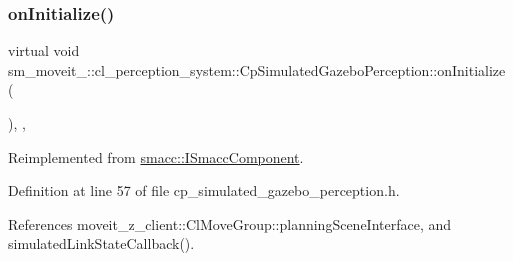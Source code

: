 \subsubsection{\texorpdfstring{on\+Initialize()}{onInitialize()}}
{\footnotesize\ttfamily virtual void sm\+\_\+moveit\+\_\+::cl\+\_\+perception\+\_\+system\+::\+Cp\+Simulated\+Gazebo\+Perception\+::on\+Initialize (\begin{DoxyParamCaption}{ }\end{DoxyParamCaption})\hspace{0.3cm}{\ttfamily [inline]}, {\ttfamily [override]}, {\ttfamily [virtual]}}



Reimplemented from \hyperlink{classsmacc_1_1ISmaccComponent_ae6f71d008db12553912e9436184b9e65}{smacc\+::\+I\+Smacc\+Component}.



Definition at line 57 of file cp\+\_\+simulated\+\_\+gazebo\+\_\+perception.\+h.



References moveit\+\_\+z\+\_\+client\+::\+Cl\+Move\+Group\+::planning\+Scene\+Interface, and simulated\+Link\+State\+Callback().


